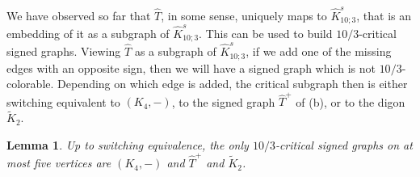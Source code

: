 \documentclass[11pt,a4paper]{article}
\newtheorem{lemma}[theorem]{Lemma}
\theoremstyle{definition}
\begin{document}
	
	
	We have observed so far that $\widehat{T}$, in some sense, uniquely maps to $\widehat{K}^s_{10;3}$, that is an embedding of it as a subgraph of $\widehat{K}^s_{10;3}$. This can be used to build $10/3$-critical signed graphs. Viewing  $\widehat{T}$ as a subgraph of $\widehat{K}^s_{10;3}$, if we add one of the missing edges with an opposite sign, then we will have a signed graph which is not $10/3$-colorable. Depending on which edge is added, the critical subgraph then is either switching equivalent to $(K_4,-)$, to the signed graph $\widehat{T}^+$ of (b), or to the digon $\widetilde{K}_2$.

	
	
	\begin{lemma}\label{lem:Few_Vertex_Critical}
		Up to switching equivalence, the only $10/3$-critical signed graphs on at most five vertices are $(K_4,-)$ and $\widehat{T}^+$ and $\widetilde{K}_2$. 
	\end{lemma}
	
\end{document}
